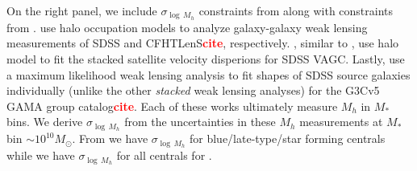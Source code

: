 \documentclass[12pt, letterpaper, preprint, tighten]{aastex}
\newcommand{\todo}[1]{{\bf \textcolor{red}{#1}}}
\begin{document}
On the right panel, we include $\sigma_{\log\,M_h}$ constraints from \cite{more2011}
along with constraints from \cite{mandelbaum2006a, conroy2007, velander2014, han2015}. 
\cite{mandelbaum2006a, velander2014} use halo occupation models to analyze galaxy-galaxy 
weak lensing measurements of SDSS and CFHTLenS\todo{cite}, respectively. 
\cite{conroy2007}, similar to \cite{more2011}, use halo model to fit the stacked 
satellite velocity disperions for SDSS VAGC. Lastly, \cite{han2015} 
use a maximum likelihood weak lensing analysis to fit shapes of SDSS source galaxies 
individually (unlike the other \emph{stacked} weak lensing analyses) for the G3Cv5 GAMA 
group catalog\todo{cite}. Each of these works ultimately measure $M_h$ in $M_*$ bins. We derive 
$\sigma_{\log\,M_h}$ from the uncertainties in these $M_h$ measurements at $M_*$ bin 
$\sim 10^{10}M_\odot$. From \cite{mandelbaum2006a, more2011, velander2014} we have 
$\sigma_{\log\,M_h}$ for blue/late-type/star forming centrals while we have 
$\sigma_{\log\,M_h}$ for all centrals for \cite{conroy2007, han2015}. 
\end{document}

